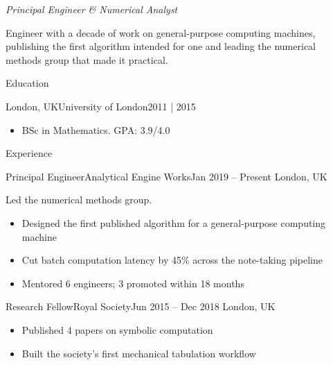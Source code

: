 \documentclass[]{mcdowellcv}
\begin{document}
      \makeheader
      
      {\large \textit{Principal Engineer \& Numerical Analyst}}\par\vspace{4pt}
      Engineer with a decade of work on general-purpose computing machines, publishing the first algorithm intended for one and leading the numerical methods group that made it practical.
      \vspace{6pt}
    
      
\vspace{3pt}
      \begin{cvsection}{Education}
      \begin{cvsubsection}{London, UK}{University of London}{2011 | 2015}
            \begin{itemize}
  \setlength\itemsep{2pt}
  \item BSc in Mathematics. GPA: 3.9/4.0
\end{itemize}
          \end{cvsubsection}
      \end{cvsection}
\vspace{3pt}
      \begin{cvsection}{Experience}
      \begin{cvsubsection}{Principal Engineer}{Analytical Engine Works}{Jan 2019 -- Present}
            London, UK
            \par Led the numerical methods group.
            \begin{itemize}%
  \setlength\itemsep{2pt}
  \item Designed the first published algorithm for a general-purpose computing machine
  \item Cut batch computation latency by 45\% across the note-taking pipeline
  \item Mentored 6 engineers; 3 promoted within 18 months
\end{itemize}
          \end{cvsubsection}
      \begin{cvsubsection}{Research Fellow}{Royal Society}{Jun 2015 -- Dec 2018}
            London, UK
            
            \begin{itemize}%
  \setlength\itemsep{2pt}
  \item Published 4 papers on symbolic computation
  \item Built the society's first mechanical tabulation workflow
\end{itemize}
          \end{cvsubsection}
      \end{cvsection}
\end{document}
